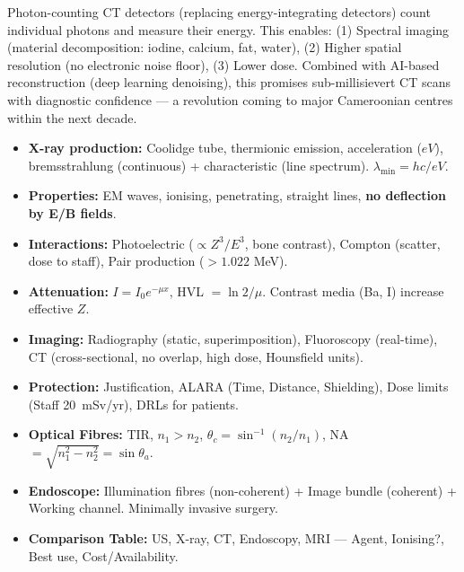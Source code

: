 \documentclass[11pt]{article}
\begin{document}
\begin{savaistu}
Photon-counting CT detectors (replacing energy-integrating detectors) count individual photons and measure their energy. This enables: (1) Spectral imaging (material decomposition: iodine, calcium, fat, water), (2) Higher spatial resolution (no electronic noise floor), (3) Lower dose. Combined with AI-based reconstruction (deep learning denoising), this promises sub-millisievert CT scans with diagnostic confidence — a revolution coming to major Cameroonian centres within the next decade.
\end{savaistu}

\begin{aretenir}
\begin{itemize}
    \item \textbf{X-ray production:} Coolidge tube, thermionic emission, acceleration ($eV$), bremsstrahlung (continuous) + characteristic (line spectrum). $\lambda_{\min} = hc/eV$.
    \item \textbf{Properties:} EM waves, ionising, penetrating, straight lines, \textbf{no deflection by E/B fields}.
    \item \textbf{Interactions:} Photoelectric ($\propto Z^3/E^3$, bone contrast), Compton (scatter, dose to staff), Pair production ($>1.022$ MeV).
    \item \textbf{Attenuation:} $I=I_0 e^{-\mu x}$, HVL $= \ln 2/\mu$. Contrast media (Ba, I) increase effective $Z$.
    \item \textbf{Imaging:} Radiography (static, superimposition), Fluoroscopy (real-time), CT (cross-sectional, no overlap, high dose, Hounsfield units).
    \item \textbf{Protection:} Justification, ALARA (Time, Distance, Shielding), Dose limits (Staff \SI{20}{mSv/yr}), DRLs for patients.
    \item \textbf{Optical Fibres:} TIR, $n_1 > n_2$, $\theta_c = \sin^{-1}(n_2/n_1)$, NA $= \sqrt{n_1^2-n_2^2} = \sin\theta_a$.
    \item \textbf{Endoscope:} Illumination fibres (non-coherent) + Image bundle (coherent) + Working channel. Minimally invasive surgery.
    \item \textbf{Comparison Table:} US, X-ray, CT, Endoscopy, MRI — Agent, Ionising?, Best use, Cost/Availability.
\end{itemize}
\end{aretenir}

\newpage
\end{document}

